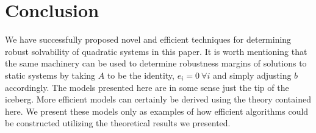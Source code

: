 \documentclass[11pt]{article}
\theoremstyle{plain}
\theoremstyle{definition}
\theoremstyle{remark}
\begin{document}
\section{Conclusion}

We have successfully proposed novel and efficient techniques for determining robust solvability of quadratic systems in this paper. It is worth mentioning that the same machinery can be used to determine robustness margins of solutions to static systems by taking $A$ to be the identity, $e_i=0 \ \forall i$ and simply adjusting $b$ accordingly. The models presented here are in some sense just the tip of the iceberg. More efficient models can certainly be derived using the theory contained here. We present these models only as examples of how efficient algorithms could be constructed utilizing the theoretical results we presented. \\


\end{document}
